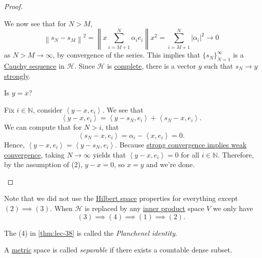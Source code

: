 \begin{proof}
\begin{explanation}
		We now see that for \(N > M\),
		\[
			\left\lVert s_N - s_M\right\rVert^2 = \left\lVert x \sum_{i=M + 1}^N \alpha_i e_i\right\rVert x ^2 = \sum_{i=M+1}^N \left\vert \alpha_i \right\vert ^2 \to 0
		\]
		as \(N > M \to \infty\), by convergence of the series. This implies that \(\{s_N\}_{N=1}^\infty\) is a \hyperref[def:Cauchy-sequence]{Cauchy sequence} in \(\mathcal{H}\).
		Since \(\mathcal{H}\) is \hyperref[def:complete]{complete}, there is a vector \(y\) such that \hyperref[def:strong-convergence]{\(s_N \to y\) strongly}.
		\begin{problem}
		Is \(y = x\)?
		\end{problem}
		\begin{answer}
			Fix \(i \in \mathbb{N}\), consider \(\left< y-x, e_i \right>\). We see that
			\[
				\left< y-x,e_i \right> = \left< y-s_N,e_i \right> + \left< s_N - x, e_i \right>.
			\]
			We can compute that for \(N > i\), that
			\[
				\left< s_N - x, e_i \right> = \alpha_i - \left< x,e_i \right>  = 0.
			\]
			Hence, \(\left< y -x,e_i \right> = \left< y-s_N,e_i \right>\). Because \hyperref[lma:strong-convergence-implies-weak-convergence]{strong convergence implies weak convergence},
			taking \(N \to \infty\) yields that \(\left< y-x,e_i \right> = 0\) for all \(i \in \mathbb{N}\). Therefore, by the assumption of (2), \(y -x = 0\), so \(x = y\) and we're done.
		\end{answer}
	\end{explanation}
\end{proof}
\begin{remark}
	Note that we did not use the \hyperref[def:Hilbert-space]{Hilbert space} properties for everything except \((2)\implies(3)\).
	When \(\mathcal{H}\) is replaced by any \hyperref[def:inner-product]{inner product} space \(V\) we only have
	\[
		(3) \implies (4) \implies (1) \implies (2).
	\]
\end{remark}
\begin{note}
	The (4) in \autoref{thm:lec-38} is called the \emph{Planchenel identity}.
\end{note}

\begin{definition}[Separable]\label{def:separable}
	A \hyperref[def:metric]{metric} space is called \emph{separable} if there exists a countable dense subset.
\end{definition}

